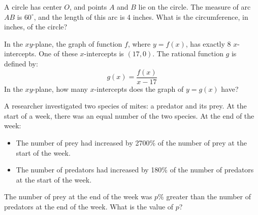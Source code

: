 \noindent\markforreview
\vspace{1em}

A circle has center \(O\), and points \(A\) and \(B\) lie on the circle.
The measure of arc \(AB\) is \(60^\circ\), and the length of this arc is 4 inches.
What is the circumference, in inches, of the circle?

\vspace{0.75em}


\vspace{2em}
\newpage

\noindent\markforreview
\vspace{1em}

In the \(xy\)-plane, the graph of function \(f\), where \(y = f(x)\), has exactly 8 \(x\)-intercepts.
One of these \(x\)-intercepts is \((17, 0)\).
The rational function \(g\) is defined by:
\[
g(x) = \frac{f(x)}{x - 17}
\]
In the \(xy\)-plane, how many \(x\)-intercepts does the graph of \(y = g(x)\) have?

\vspace{0.75em}


\vspace{2em}
\newpage

\noindent\markforreview
\vspace{1em}

A researcher investigated two species of mites: a predator and its prey.
At the start of a week, there was an equal number of the two species.
At the end of the week:

\begin{itemize}
\item The number of prey had increased by 2700\% of the number of prey at the start of the week.
\item The number of predators had increased by 180\% of the number of predators at the start of the week.
\end{itemize}

The number of prey at the end of the week was \(p\%\) greater than the number of predators at the end of the week.
What is the value of \(p\)?

\vspace{0.75em}


